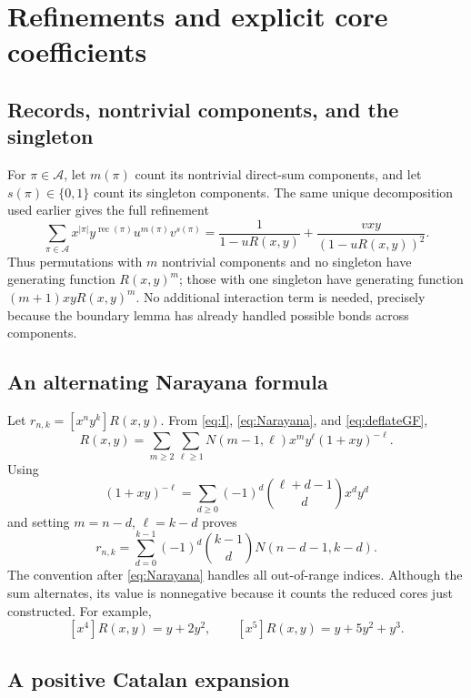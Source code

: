 \documentclass[11pt,a4paper]{article}
\theoremstyle{definition}
\theoremstyle{remark}
\newcommand{\rec}{\operatorname{rec}}
\newcommand{\class}{\mathcal{A}}
\begin{document}
\section{Refinements and explicit core coefficients}

\subsection{Records, nontrivial components, and the singleton}

For $\pi\in\class$, let $m(\pi)$ count its nontrivial direct-sum components,
and let $s(\pi)\in\{0,1\}$ count its singleton components. The same unique
decomposition used earlier gives the full refinement
\begin{equation}\label{eq:refinedA}
 \boxed{\displaystyle
 \sum_{\pi\in\class}x^{|\pi|}y^{\rec(\pi)}u^{m(\pi)}v^{s(\pi)}
 =\frac{1}{1-uR(x,y)}+
   \frac{vxy}{(1-uR(x,y))^2}.}
\end{equation}
Thus permutations with $m$ nontrivial components and no singleton have
generating function $R(x,y)^m$; those with one singleton have generating
function $(m+1)xyR(x,y)^m$. No additional interaction term is needed,
precisely because the boundary lemma has already handled possible bonds
across components.

\subsection{An alternating Narayana formula}

Let $r_{n,k}=[x^ny^k]R(x,y)$. From \eqref{eq:I}, \eqref{eq:Narayana}, and
\eqref{eq:deflateGF},
\[
 R(x,y)=\sum_{m\geq2}\sum_{\ell\geq1}
 N(m-1,\ell)x^my^\ell(1+xy)^{-\ell}.
\]
Using
\[
 (1+xy)^{-\ell}
 =\sum_{d\geq0}(-1)^d\binom{\ell+d-1}{d}x^dy^d
\]
and setting $m=n-d$, $\ell=k-d$ proves
\begin{equation}\label{eq:rnkalternating}
 \boxed{\displaystyle
 r_{n,k}=\sum_{d=0}^{k-1}(-1)^d\binom{k-1}{d}
                       N(n-d-1,k-d).}
\end{equation}
The convention after \eqref{eq:Narayana} handles all out-of-range indices.
Although the sum alternates, its value is nonnegative because it counts
the reduced cores just constructed. For example,
\[
 [x^4]R(x,y)=y+2y^2,\qquad
 [x^5]R(x,y)=y+5y^2+y^3.
\]

\subsection{A positive Catalan expansion}
\end{document}
